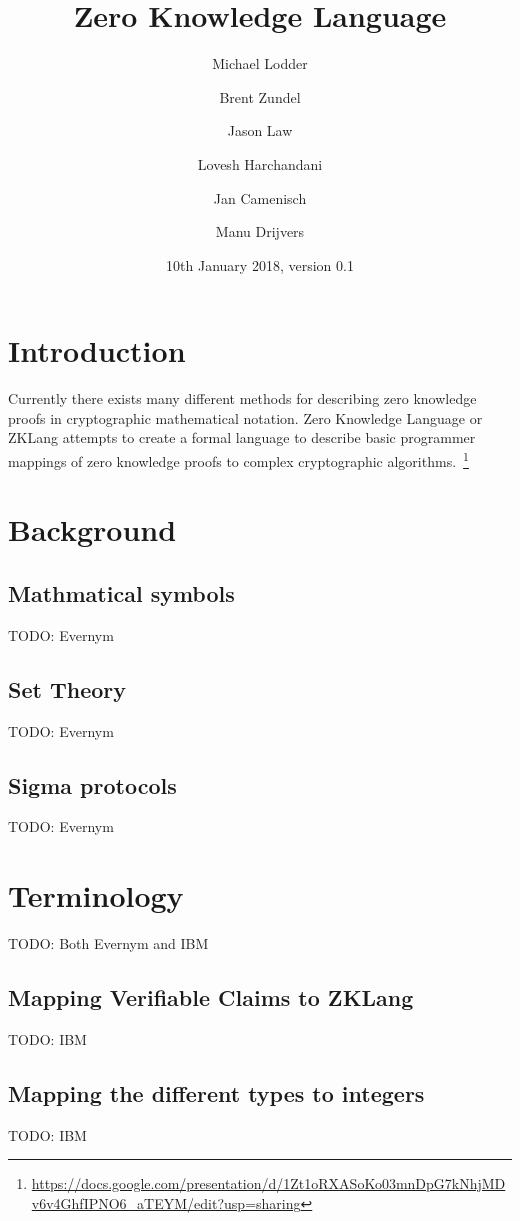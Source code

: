 \documentclass[a4paper]{article}
\title{Zero Knowledge Language}
\author[1]{Michael Lodder}
\author[1]{Brent Zundel}
\author[1]{Jason Law}
\author[1]{Lovesh Harchandani}
\author[2]{Jan Camenisch}
\author[2]{Manu Drijvers}
\affil[1]{Evernym}
\affil[2]{IBM Zurich}
\date{10th January 2018, version 0.1}
\begin{document}
\maketitle

\section{Introduction}
Currently there exists many different methods for describing zero knowledge proofs in cryptographic mathematical notation. Zero Knowledge Language or ZKLang attempts to create a formal language to describe basic programmer mappings of zero knowledge proofs to complex cryptographic algorithms.~\footnote{\url{https://docs.google.com/presentation/d/1Zt1oRXASoKo03mnDpG7kNhjMDv6v4GhfIPNO6_aTEYM/edit?usp=sharing}}

\section{Background}

\subsection{Mathmatical symbols}
TODO: Evernym

\subsection{Set Theory}
TODO: Evernym

\subsection{Sigma protocols}
TODO: Evernym

\section{Terminology}
TODO: Both Evernym and IBM
%




\subsection{Mapping Verifiable Claims to ZKLang}
TODO: IBM

\subsection{Mapping the different types to integers}
TODO: IBM
\end{document}
